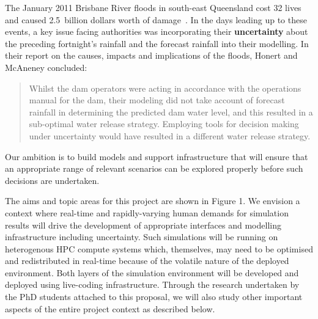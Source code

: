 The January 2011 Brisbane River floods in south-east Queensland cost
32 lives and caused 2.5~billion dollars worth of
damage~\parencite{vandenhonert2011}. In the days leading up to these
events, a key issue facing authorities was incorporating their
\textbf{uncertainty} about the preceding fortnight's rainfall and the
forecast rainfall into their modelling. In their report on the causes,
impacts and implications of the floods,  Honert and McAneney \cite{vandenhonert2011}
concluded:
\blockquote{Whilst the dam operators were acting in accordance with the operations manual for the dam, their modeling did not take account of forecast rainfall in determining the predicted dam water level, and this resulted in a sub-optimal water release strategy. Employing tools for decision making under uncertainty would have resulted in a different water release strategy.}

Our ambition is to build models 
and support infrastructure that will ensure that an appropriate range of relevant scenarios
can be explored properly before such decisions are undertaken.

The aims and topic areas for this project are
 shown in Figure 1. We envision a context where real-time and rapidly-varying human demands for 
 simulation results will drive the development of appropriate interfaces and modelling infrastructure including uncertainty. 
 Such simulations will be running on heterogenous HPC compute systems which, themselves, may need to be optimised and redistributed in real-time because of the volatile nature of the deployed environment. Both layers of the simulation environment will be developed and deployed using live-coding infrastructure. Through the research undertaken by the PhD students attached to this proposal, we will also study other important aspects of the entire project context as described below. 
 
 
